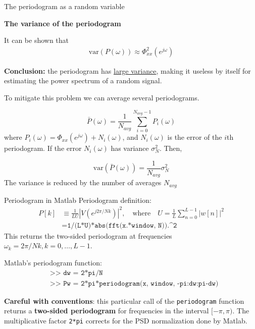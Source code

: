 \documentclass[10pt]{beamer}
\begin{document}
\begin{frame}{The periodogram as a random variable}

\textbf{The variance of the periodogram}

It can be shown that
\begin{align*}
	\mathrm{var}(P(\omega)) \approx \Phi_{xx}^2(e^{j\omega})
\end{align*}

\vspace{-0.25cm}
\textbf{Conclusion:} the periodogram has \underline{large variance}, making it useless by itself for estimating the power spectrum of a random signal.

\vspace{0.25cm}
To mitigate this problem we can average several periodograms. 

\begin{equation*}
\bar{P}(\omega) = \frac{1}{N_{avg}}\sum_{i = 0}^{N_{avg}-1} P_i(\omega)
\end{equation*}
where $P_i(\omega) = \Phi_{xx}(e^{j\omega}) + N_i(\omega)$, and $N_i(\omega)$ is the error of the $i$th periodogram. If the error $N_i(\omega)$ has variance $\sigma_N^2$. Then,

\begin{equation*}
	\mathrm{var}(\bar{P}(\omega)) = \frac{1}{N_{avg}}\sigma_N^2
\end{equation*}
The variance is reduced by the number of averages $N_{avg}$

\end{frame}

\begin{frame}{Periodogram in Matlab}
Periodogram definition:
\begin{align*}
P[k] &\equiv \frac{1}{LU}|V(e^{j2\pi/Nk})|^2, \quad\text{where}\quad U = \frac{1}{L}\sum_{n = 0}^{L-1}|w[n]|^2 \\
&= \texttt{1/(L*U)*abs(fft(x.*window, N)).\textasciicircum 2} \tag{Matlab code}
\end{align*}
This returns the two-sided periodogram at frequencies $\omega_k = 2\pi/Nk, k=0, \ldots, L-1$.

Matlab's periodogram function:
\begin{align*}
&\texttt{>> dw = 2*pi/N} \\
&\texttt{>> Pw = 2*pi*periodogram(x, window, -pi:dw:pi-dw)}
\end{align*}

\textbf{Careful with conventions}: this particular call of the \texttt{periodogram} function returns a \textbf{two-sided periodogram} for frequencies in the interval $[-\pi, \pi)$. The multiplicative factor \texttt{2*pi} corrects for the PSD normalization done by Matlab.
\end{frame}
\end{document}
